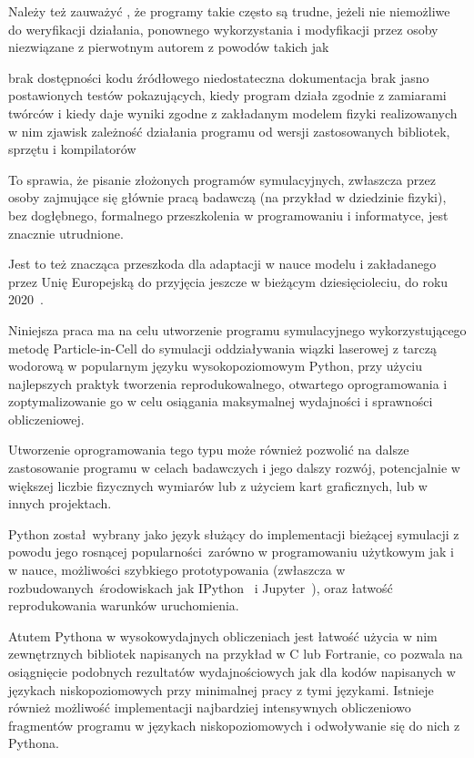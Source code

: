Należy też zauważyć%
, że programy takie często są
trudne, jeżeli nie niemożliwe do weryfikacji działania, ponownego wykorzystania
i modyfikacji przez osoby niezwiązane z pierwotnym autorem z powodów takich jak
\begin{itemize}
    \itemi{} brak dostępności kodu źródłowego
    \itemi{} niedostateczna dokumentacja
    \itemi{} brak jasno postawionych testów pokazujących, kiedy program działa
    zgodnie z zamiarami twórców i kiedy daje wyniki zgodne z zakładanym
    modelem fizyki realizowanych w nim zjawisk
    \itemi{} zależność działania programu od wersji zastosowanych bibliotek, sprzętu i kompilatorów
\end{itemize}

To sprawia, że pisanie złożonych programów symulacyjnych, zwłaszcza przez osoby
zajmujące się głównie pracą badawczą (na przykład w dziedzinie fizyki), bez dogłębnego, formalnego przeszkolenia
w programowaniu i informatyce, jest znacznie utrudnione.

Jest to też znacząca przeszkoda dla adaptacji
w nauce modelu  i  zakładanego przez Unię Europejską 
do przyjęcia jeszcze w bieżącym dziesięcioleciu, do roku 2020~\cite{euopenscience}.

Niniejsza praca ma na celu utworzenie programu symulacyjnego wykorzystującego metodę Particle-in-Cell
do symulacji oddziaływania wiązki laserowej z tarczą wodorową w popularnym języku
wysokopoziomowym Python, przy użyciu najlepszych praktyk tworzenia reprodukowalnego, otwartego oprogramowania
i zoptymalizowanie go w celu osiągania maksymalnej wydajności i sprawności obliczeniowej.

Utworzenie oprogramowania tego typu może również pozwolić na dalsze
zastosowanie programu w celach badawczych i jego dalszy rozwój, potencjalnie w
większej liczbie fizycznych wymiarów lub z użyciem kart graficznych, lub w
innych projektach.

Python został wybrany jako język służący do implementacji bieżącej symulacji
z powodu jego rosnącej popularności zarówno w programowaniu użytkowym jak i w nauce,
możliwości szybkiego prototypowania (zwłaszcza w rozbudowanych środowiskach jak
IPython~\cite{ipython} i Jupyter~\cite{jupyter}), oraz łatwość reprodukowania
warunków uruchomienia.

Atutem Pythona w wysokowydajnych obliczeniach jest łatwość użycia w nim
zewnętrznych bibliotek napisanych na przykład w C lub Fortranie, co pozwala na
osiągnięcie podobnych rezultatów wydajnościowych jak dla kodów napisanych w
językach niskopoziomowych przy minimalnej pracy z tymi językami. Istnieje
również możliwość implementacji najbardziej intensywnych obliczeniowo
fragmentów programu w językach niskopoziomowych i odwoływanie się do nich z
Pythona.

